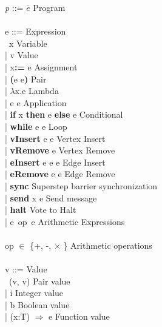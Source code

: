 \begin{frame}
  \begin{tiny}
  \begin{roman-grammar}
    \textit{p} ::= $\overline{e}$  \>\>\>\>\> Program \\
\ \\
  e ::= \>\>\>\>\> Expression \\
  \ttab \ x \>\>\>\>\> Variable \\
  \ttab | v  \>\>\>\>\> Value \\
  \ttab | x\textbf{:=} e \>\>\>\>\> Assignment \\
  \ttab | \textbf{(}e e\textbf{)} \>\>\>\>\> Pair \\
  \ttab | $\lambda$x.e \>\>\>\>\> Lambda \\
  \ttab | e e \>\>\>\>\> Application \\
  \ttab |  \textbf{if} x \textbf{then} e \textbf{else} e \>\>\>\>\> Conditional \\
  \ttab |  \textbf{while} e e \>\>\>\>\> Loop \\
  \ttab |  \textbf{vInsert} e e \>\>\>\>\> Vertex Insert \\
  \ttab |  \textbf{vRemove} e  \>\>\>\>\> Vertex Remove \\
  \ttab |  \textbf{eInsert} e e e  \>\>\>\>\> Edge Insert \\
  \ttab |  \textbf{eRemove} e e \>\>\>\>\> Edge Remove \\
  \ttab |  \textbf{sync} \>\>\>\>\> Superstep barrier synchronization\\
  \ttab |  \textbf{send} x e \>\>\>\>\> Send message\\
  \ttab |  \textbf{halt} \>\>\>\>\> Vote to Halt \\
  \ttab |  e\ op\ e \>\>\>\>\> Arithmetic Expressions \\  
\ \\
  op $\in$ \{+, -, $\times$ \} \>\>\>\>  Arithmetic operations \\
\ \\    
  v ::= \>\>  Value \\
    \ttab \ (v, v) \>\>\>\>  Pair value \\
    \ttab | i \>\>\>\>  Integer value\\
    \ttab | b \>\>\>\>  Boolean value\\
    \ttab | (x:T) $\Rightarrow$ e \>\>\>\>  Function value\\
    

\end{roman-grammar}
\end{tiny}    
\end{frame}

